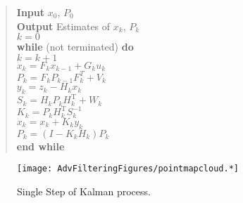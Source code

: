 \begin{quote}
\textbf{Input} \(x_0\), \(P_0\)\\
\textbf{Output} Estimates of \(x_k\), \(P_k\)\\
\(k=0\)\\
\textbf{while} (not terminated) \textbf{do}\\
\hspace*{0.333em}\hspace*{0.333em}\hspace*{0.333em}\(k=k+1\)\\
\hspace*{0.333em}\hspace*{0.333em}\hspace*{0.333em}\(x_k = F_{k}x_{k-1} + G_{k} u_{k}\)\\
\hspace*{0.333em}\hspace*{0.333em}\hspace*{0.333em}\(P_{k} = F_{k} P_{k-1} F_{k}^{T} + V_{k}\)\\
\hspace*{0.333em}\hspace*{0.333em}\hspace*{0.333em}\(y_k = z_k - H_kx_{k}\)\\
\hspace*{0.333em}\hspace*{0.333em}\hspace*{0.333em}\(S_k = H_k P_{k} H_k^\text{T} + W_k\)\\
\hspace*{0.333em}\hspace*{0.333em}\hspace*{0.333em}\(K_k = P_{k}H_k^\text{T}S_k^{-1}\)\\
\hspace*{0.333em}\hspace*{0.333em}\hspace*{0.333em}\(x_k =   x_{k} + K_k y_k\)\\
\hspace*{0.333em}\hspace*{0.333em}\hspace*{0.333em}\(P_{k} = (I - K_k H_k) P_{k}\)\\
\textbf{end while}
\end{quote}

\begin{figure}
\centering
\texttt{[image: AdvFilteringFigures/pointmapcloud.*]}
\caption{Single Step of Kalman process.}
\end{figure}

